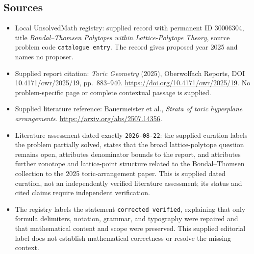 \documentclass[11pt]{article}
\begin{document}
\subsection{Sources}
\begin{itemize}
\item Local UnsolvedMath registry: supplied record with permanent ID \(30006304\), title \emph{Bondal--Thomsen Polytopes within Lattice-Polytope Theory}, source problem code \texttt{catalogue entry}. The record gives proposed year 2025 and names no proposer.
\item Supplied report citation: \emph{Toric Geometry} (2025), Oberwolfach Reports, DOI 10.4171/owr/2025/19, pp.\ 883--940. \url{https://doi.org/10.4171/owr/2025/19}. No problem-specific page or complete contextual passage is supplied.
\item Supplied literature reference: Bauermeister et al., \emph{Strata of toric hyperplane arrangements}. \url{https://arxiv.org/abs/2507.14356}.
\item Literature assessment dated exactly \texttt{2026-08-22}: the supplied curation labels the problem partially solved, states that the broad lattice-polytope question remains open, attributes denominator bounds to the report, and attributes further zonotope and lattice-point structure related to the Bondal--Thomsen collection to the 2025 toric-arrangement paper. This is supplied dated curation, not an independently verified literature assessment; its status and cited claims require independent verification.
\item The registry labels the statement \texttt{corrected\_verified}, explaining that only formula delimiters, notation, grammar, and typography were repaired and that mathematical content and scope were preserved. This supplied editorial label does not establish mathematical correctness or resolve the missing context.
\end{itemize}
\end{document}
